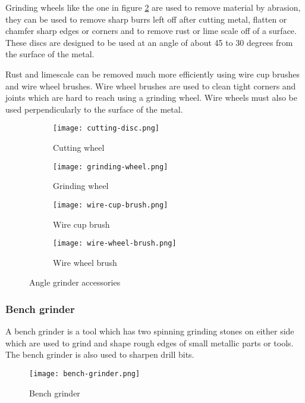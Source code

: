 \documentclass[a4paper,12pt]{article}
\begin{document}
						Grinding wheels like the one in figure \ref{subfig:grinding-wheel} are used to remove material by abrasion, they can be used to remove sharp burrs left off after cutting metal, flatten or chamfer sharp edges or corners and to remove rust or lime scale off of a surface.
						These discs are designed to be used at an angle of about 45 to 30 degrees from the surface of the metal. 
						 
						 Rust and limescale can be removed much more efficiently using wire cup brushes and wire wheel brushes.
						 Wire wheel brushes are used to clean tight corners and joints which are hard to reach using a grinding wheel.
						 Wire wheels must also be used perpendicularly to the surface of the metal.
						  
						\begin{figure}[H]
							\begin{subfigure}{0.4\linewidth}
								\centering				
								\texttt{[image: cutting-disc.png]}
								\caption{Cutting wheel}
								\label{subfig:cutting-wheel}
							\end{subfigure}
							\hfill
							\begin{subfigure}{0.4\linewidth}
								\centering				
								\texttt{[image: grinding-wheel.png]}	
								\caption{Grinding wheel}
								\label{subfig:grinding-wheel}
							\end{subfigure}
							\hfill
							\begin{subfigure}{0.4\linewidth}
								\centering				
								\texttt{[image: wire-cup-brush.png]}				
								\caption{Wire cup brush}
								\label{subfig:wire-cup-brush}
							\end{subfigure}
							\hfill
							\begin{subfigure}{0.4\linewidth}
								\centering				
								\texttt{[image: wire-wheel-brush.png]}
								\caption{Wire wheel brush}
								\label{subfig:wire-wheel-brush}
							\end{subfigure}
							\label{fig:angle-grinder-accessories}
							\caption{Angle grinder accessories}
						\end{figure}
						
				\subsubsection*{Bench grinder}
				
				A bench grinder is a tool which has two spinning grinding stones on either side which are used to grind and shape rough edges of small metallic parts or tools.
				The bench grinder is also used to sharpen drill bits.   
						\begin{figure}[H]
							\centering				
							\texttt{[image: bench-grinder.png]}	
							\caption{Bench grinder}
							\label{fig:bench-grinder}
						\end{figure}
			
\end{document}
